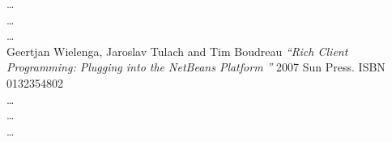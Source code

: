 \begin{thebibliography}{}
 \ldots
\\

 \ldots
\\

 \ldots
\\


 Geertjan Wielenga, Jaroslav Tulach and Tim Boudreau
\emph{``Rich Client Programming: Plugging into the NetBeans Platform ''} 2007
Sun Press. ISBN 0132354802
\\

 \ldots
\\

 \ldots
\\

 \ldots
\\

\end{thebibliography} 